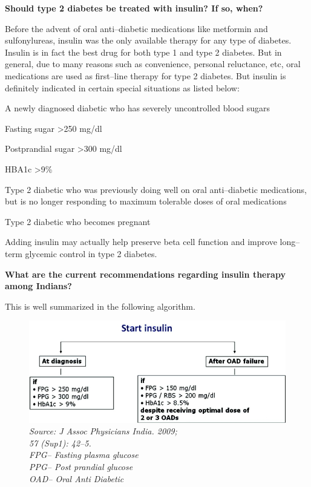 \textbf{Should type 2 diabetes be treated with insulin? If so, when?}

Before the advent of oral anti–diabetic medications like metformin and sulfonylureas, insulin was the only available therapy for any type of diabetes. Insulin is in fact the best drug for both type 1 and type 2 diabetes. But in general, due to many reasons such as convenience, personal reluctance, etc, oral medications are used as first–line therapy for type 2 diabetes. But insulin is definitely indicated in certain special situations as listed below:

\item A newly diagnosed diabetic who has severely uncontrolled blood sugars
 \item Fasting sugar \textgreater  250 mg/dl

 \item Postprandial sugar \textgreater  300 mg/dl

 \item HBA1c \textgreater 9\%


 \item Type 2 diabetic who was previously doing well on oral anti–diabetic medications, but is no longer responding to maximum tolerable doses of oral medications

 \item Type 2 diabetic who becomes pregnant

Adding insulin may actually help preserve beta cell function and improve long–term glycemic control in type 2 diabetes.

\textbf{What are the current recommendations regarding insulin therapy among Indians?}

This is well summarized in the following algorithm.

\begin{figure}
\includegraphics{images/088.jpg}
\caption{\textit{Source: J Assoc Physicians India. 2009;\\ 57 (Sup1): 42–5.\\ FPG– Fasting plasma glucose\\ PPG– Post prandial glucose\\ OAD– Oral Anti Diabetic}}
\end{figure}

